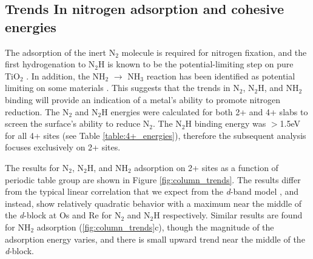 \subsection{Trends In nitrogen adsorption and cohesive energies}
\label{sec:reactivity}

The adsorption of the inert N$_2$ molecule is required for nitrogen fixation, and the first hydrogenation to N$_2$H is known to be the potential-limiting step on pure TiO$_2$ \cite{Comer_2018}. In addition, the NH$_2$ $\rightarrow$ NH$_3$ reaction has been identified as potential limiting on some materials \cite{Hoskuldsson_2017}. This suggests that the trends in N$_2$, N$_2$H, and NH$_2$ binding will provide an indication of a metal's ability to promote nitrogen reduction. The N$_2$ and N$_2$H energies were calculated for both 2+ and 4+ slabs to screen the surface's ability to reduce N$_2$. The N$_2$H binding energy was $>$1.5eV for all 4+ sites (see Table \ref{table:4+_energies}), therefore the subsequent analysis focuses exclusively on 2+ sites.

The results for N$_2$, N$_2$H, and NH$_2$ adsorption on 2+ sites as a function of periodic table group are shown in Figure \ref{fig:column_trends}. The results differ from the typical linear correlation that we expect from the \textit{d}-band model \cite{Nilsson_2008}, and instead, show relatively quadratic behavior with a maximum near the middle of the \textit{d}-block at Os and Re  for N$_2$ and N$_2$H respectively. Similar results are found for NH$_2$ adsorption (\ref{fig:column_trends}c), though the magnitude of the adsorption energy varies, and there is small upward trend near the middle of the \textit{d}-block. 


